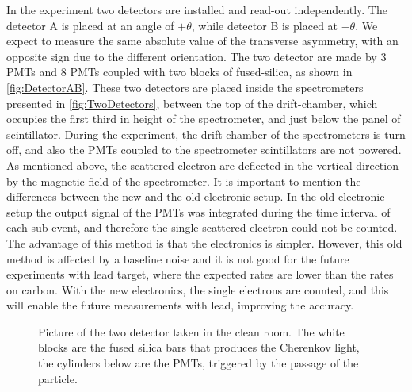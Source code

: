 In the experiment two detectors are installed and read-out independently. The detector A is placed at an angle of $+\theta$, while detector B is placed at $-\theta$. We expect to measure the same absolute value of the transverse asymmetry, with an opposite sign due to the different orientation. 
The two detector are made by 3 PMTs and 8 PMTs coupled with two blocks of fused-silica, as shown in \ref{fig:DetectorAB}.
These two detectors are placed inside the spectrometers presented in \ref{fig:TwoDetectors}, between the top of the drift-chamber, which occupies the first third in height of the spectrometer, and just below the panel of scintillator. During the experiment, the drift chamber of the spectrometers is turn off, and also the PMTs coupled to the spectrometer scintillators are not powered.
As mentioned above, the scattered electron are deflected in the vertical direction by the magnetic field of the spectrometer. It is important to mention the differences between the new and the old electronic setup. In the old electronic setup the output signal of the PMTs was integrated during the time interval of each sub-event, and therefore the single scattered electron could not be counted. The advantage of this method is that the electronics is simpler. However, this old method is affected by a baseline noise and it is not good for the future experiments with lead target, where the expected rates are lower than the rates on carbon.
With the new electronics, the single electrons are counted, and this will enable the future measurements with lead, improving the accuracy. 

\begin{figure}[hbtp]
\centering
{} \quad
{} \quad
	\label{fig:Detectors}
\caption{Picture of the two detector taken in the clean room. The white blocks are the fused silica bars that produces the Cherenkov light, the cylinders below are the PMTs, triggered by the passage of the particle. }
\end{figure}

